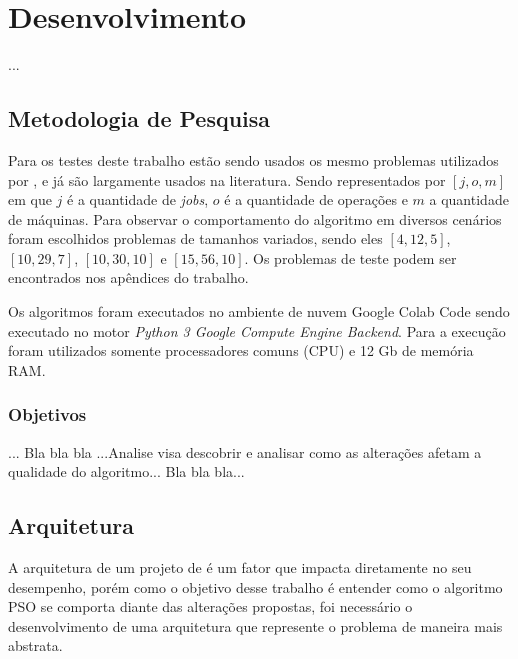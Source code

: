 \chapter{Desenvolvimento}
    ...


\section{Metodologia de Pesquisa}
        Para os testes deste trabalho estão sendo usados os mesmo problemas utilizados por \cite{Kacem2002}, e já são largamente usados na literatura. Sendo representados por $[j, o, m]$ em que $j$ é a quantidade de \textit{jobs}, $o$ é a quantidade de operações e $m$ a quantidade de máquinas. Para observar o comportamento do algoritmo em diversos cenários foram escolhidos problemas de tamanhos variados, sendo eles $[4, 12, 5]$, $[10, 29, 7]$, $[10, 30, 10]$ e $[15, 56, 10]$. Os problemas de teste podem ser encontrados nos apêndices do trabalho.\newline

        Os algoritmos foram executados no ambiente de nuvem Google Colab Code sendo executado no motor \textit{Python 3 Google Compute Engine Backend}. Para a execução foram utilizados somente processadores comuns (CPU) e 12 Gb de memória RAM.

    \subsection{Objetivos}
        ... Bla bla bla ...Analise visa descobrir e analisar como as alterações afetam a qualidade do algoritmo... Bla bla bla...


\section{Arquitetura}
        A arquitetura de um projeto de é um fator que impacta diretamente no seu desempenho, porém como o objetivo desse trabalho é entender como o algoritmo PSO se comporta diante das alterações propostas, foi necessário o desenvolvimento de uma arquitetura que represente o problema de maneira mais abstrata.

